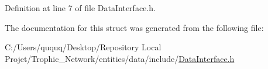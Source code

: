 Definition at line 7 of file Data\+Interface.\+h.



The documentation for this struct was generated from the following file\+:\begin{DoxyCompactItemize}
\item 
C\+:/\+Users/ququq/\+Desktop/\+Repository Local Projet/\+Trophic\+\_\+\+Network/entities/data/include/\mbox{\hyperlink{_data_interface_8h}{Data\+Interface.\+h}}\end{DoxyCompactItemize}
